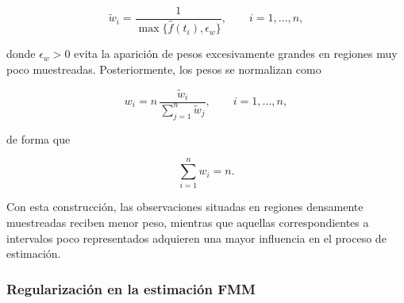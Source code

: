 \documentclass[12pt, a4paper]{report}
\begin{document}
\[
\widetilde{w}_i=
\frac{1}
{\max\{\widehat f(t_i),\epsilon_w\}},
\qquad i=1,\ldots,n,
\]

donde \(\epsilon_w>0\) evita la aparición de pesos excesivamente grandes en regiones muy poco muestreadas. Posteriormente, los pesos se normalizan como

\[
w_i=
n\,
\frac{\widetilde{w}_i}
{\sum_{j=1}^{n}\widetilde{w}_j},
\qquad i=1,\ldots,n,
\]

de forma que

\[
\sum_{i=1}^{n}w_i=n.
\]

Con esta construcción, las observaciones situadas en regiones densamente muestreadas reciben menor peso, mientras que aquellas correspondientes a intervalos poco representados adquieren una mayor influencia en el proceso de estimación.

\subsubsection{Regularización en la estimación FMM}
\end{document}
